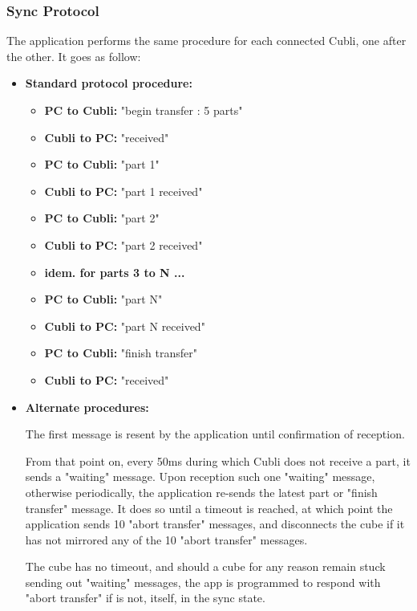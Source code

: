 \subsubsection{Sync Protocol}

The application performs the same procedure for each connected Cubli, one after the other. It goes as follow:

\begin{itemize}
\item[] \textbf{Standard protocol procedure:}

\begin{itemize}
\item[] \textbf{PC to Cubli:} "begin transfer : 5 parts"
\item[] \textbf{Cubli to PC:} "received"
\item[] \textbf{PC to Cubli:} "part 1"
\item[] \textbf{Cubli to PC:} "part 1 received"
\item[] \textbf{PC to Cubli:} "part 2"
\item[] \textbf{Cubli to PC:} "part 2 received"
\item[] \textbf{idem. for parts 3 to N ...}
\item[] \textbf{PC to Cubli:} "part N"
\item[] \textbf{Cubli to PC:} "part N received"
\item[] \textbf{PC to Cubli:} "finish transfer"
\item[] \textbf{Cubli to PC:} "received"
\end{itemize}

\item[] \textbf{Alternate procedures:}

The first message is resent by the application until confirmation of reception.

From that point on, every 50ms during which Cubli does not receive a part, it sends a "waiting" message. 
Upon reception such one "waiting" message, otherwise periodically, the application re-sends the latest part or "finish transfer" message. It does so until a timeout is reached, at which point the application sends 10 "abort transfer" messages, and disconnects the cube if it has not mirrored any of the 10 "abort transfer" messages.

The cube has no timeout, and should a cube for any reason remain stuck sending out "waiting" messages, the app is programmed to respond with "abort transfer" if is not, itself, in the sync state.

\end{itemize}

